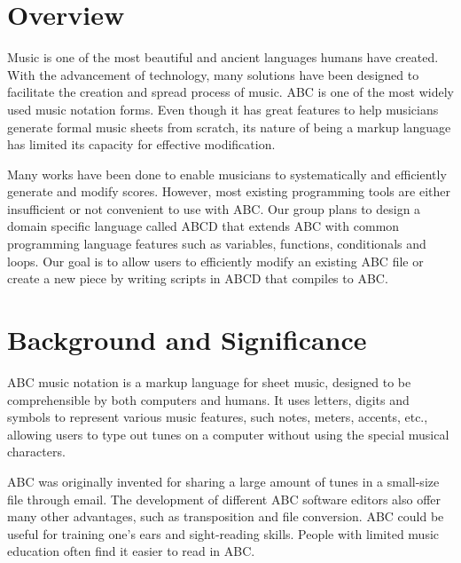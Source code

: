 \section{Overview}

Music is one of the most beautiful and ancient languages humans have created. With the advancement of technology, many solutions have been designed to facilitate the creation and spread process of music. ABC is one of the most widely used music notation forms. Even though it has great features to help musicians generate formal music sheets from scratch, its nature of being a markup language has limited its capacity for effective modification.

Many works have been done to enable musicians to systematically and efficiently generate and modify scores. However, most existing programming tools are either insufficient or not convenient to use with ABC. Our group plans to design a domain specific language called ABCD that extends ABC with common programming language features such as variables, functions, conditionals and loops. Our goal is to allow users to efficiently modify an existing ABC file or create a new piece by writing scripts in ABCD that compiles to ABC.

\section{Background and Significance}

ABC music notation is a markup language for sheet music, designed to be comprehensible by both computers and humans. It uses letters, digits and symbols to represent various music features, such notes, meters, accents, etc., allowing users to type out tunes on a computer without using the special musical characters\cite{Walshaw11}.

ABC was originally invented for sharing a large amount of tunes in a small-size file through email\cite{Johnson17}. The development of different ABC software editors also offer many other advantages, such as transposition and file conversion. ABC could be useful for training one's ears and sight-reading skills. People with limited music education often find it easier to read in ABC\cite{Mary14}. 

